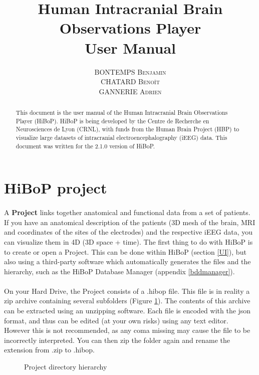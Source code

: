 \documentclass[a4paper]{article}
\title{Human Intracranial Brain Observations Player \\ User Manual}
\author{\textsc{BONTEMPS Benjamin} \\ \textsc{CHATARD Benoît} \\ \textsc{GANNERIE Adrien}}
\begin{document}
\maketitle
\begin{abstract}
This document is the user manual of the Human Intracranial Brain Observations Player (HiBoP). HiBoP is being developed by the Centre de Recherche en Neurosciences de Lyon (CRNL), with funds from the Human Brain Project (HBP) to visualize large datasets of intracranial electroencephalography (iEEG) data. This document was written for the 2.1.0 version of HiBoP.
\end{abstract}
\tableofcontents
\section{HiBoP project} \label{data}
\paragraph{} A \textbf{Project} links together anatomical and functional data from a set of patients. If you have an anatomical description of the patients (3D mesh of the brain, MRI and coordinates of the sites of the electrodes) and the respective iEEG data, you can visualize them in 4D (3D space + time). The first thing to do with HiBoP is to create or open a Project. This can be done within HiBoP (section \ref{UI}), but also using a third-party software which automatically generates the files and the hierarchy, such as the HiBoP Database Manager (appendix \ref{bddmanager}).
\paragraph{} On your Hard Drive, the Project consists of a .hibop file. This file is in reality a zip archive containing several subfolders (Figure \ref{projectDirectory}). The contents of this archive can be extracted using an unzipping software. Each file is encoded with the json format, and thus can be edited (at your own risks) using any text editor. However this is not recommended, as any coma missing may cause the file to be incorrectly interpreted. You can then zip the folder again and rename the extension from .zip to .hibop.
\begin{figure}[H]
\caption{\label{projectDirectory}Project directory hierarchy}
\end{figure}
\end{document}
